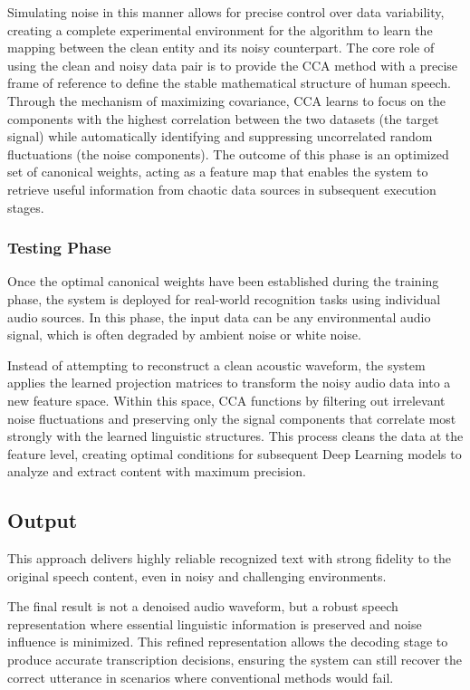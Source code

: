 Simulating noise in this manner allows for precise control over data variability, creating a complete experimental environment for the algorithm to learn the mapping between the clean entity and its noisy counterpart. The core role of using the clean and noisy data pair is to provide the CCA method with a precise frame of reference to define the stable mathematical structure of human speech. Through the mechanism of maximizing covariance, CCA learns to focus on the components with the highest correlation between the two datasets (the target signal) while automatically identifying and suppressing uncorrelated random fluctuations (the noise components). The outcome of this phase is an optimized set of canonical weights, acting as a feature map that enables the system to retrieve useful information from chaotic data sources in subsequent execution stages.

\subsubsection{Testing Phase}
Once the optimal canonical weights have been established during the training phase, the system is deployed for real-world recognition tasks using individual audio sources. In this phase, the input data can be any environmental audio signal, which is often degraded by ambient noise or white noise. 

Instead of attempting to reconstruct a clean acoustic waveform, the system applies the learned projection matrices to transform the noisy audio data into a new feature space. Within this space, CCA functions by filtering out irrelevant noise fluctuations and preserving only the signal components that correlate most strongly with the learned linguistic structures. This process cleans the data at the feature level, creating optimal conditions for subsequent Deep Learning models to analyze and extract content with maximum precision.

\subsection{Output}
This approach delivers highly reliable recognized text with strong fidelity to the original speech content, even in noisy and challenging environments. 

The final result is not a denoised audio waveform, but a robust speech representation where essential linguistic information is preserved and noise influence is minimized. This refined representation allows the decoding stage to produce accurate transcription decisions, ensuring the system can still recover the correct utterance in scenarios where conventional methods would fail.